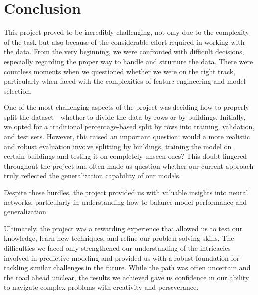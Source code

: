 \section{Conclusion}

This project proved to be incredibly challenging, not only due to the complexity of the task but also because of the considerable effort required in working with the data. From the very beginning, we were confronted with difficult decisions, especially regarding the proper way to handle and structure the data. There were countless moments when we questioned whether we were on the right track, particularly when faced with the complexities of feature engineering and model selection.

One of the most challenging aspects of the project was deciding how to properly split the dataset—whether to divide the data by rows or by buildings. Initially, we opted for a traditional percentage-based split by rows into training, validation, and test sets. However, this raised an important question: would a more realistic and robust evaluation involve splitting by buildings, training the model on certain buildings and testing it on completely unseen ones? This doubt lingered throughout the project and often made us question whether our current approach truly reflected the generalization capability of our models.

Despite these hurdles, the project provided us with valuable insights into neural networks, particularly in understanding how to balance model performance and generalization. 

Ultimately, the project was a rewarding experience that allowed us to test our knowledge, learn new techniques, and refine our problem-solving skills. The difficulties we faced only strengthened our understanding of the intricacies involved in predictive modeling and provided us with a robust foundation for tackling similar challenges in the future. While the path was often uncertain and the road ahead unclear, the results we achieved gave us confidence in our ability to navigate complex problems with creativity and perseverance.

